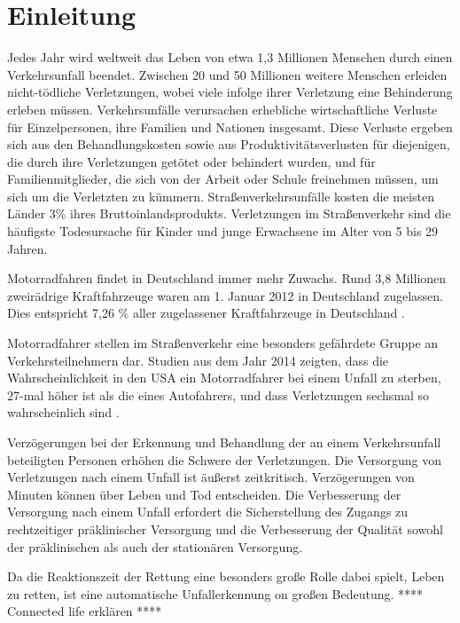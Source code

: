 \chapter{Einleitung}
%
%
%
%
%
%
Jedes Jahr wird weltweit das Leben von etwa 1,3 Millionen Menschen durch einen Verkehrsunfall beendet. Zwischen 20 und 50 Millionen weitere Menschen erleiden nicht-tödliche Verletzungen, wobei viele infolge ihrer Verletzung eine Behinderung erleben müssen. Verkehrsunfälle verursachen erhebliche wirtschaftliche Verluste für Einzelpersonen, ihre Familien und Nationen insgesamt. Diese Verluste ergeben sich aus den Behandlungskosten sowie aus Produktivitätsverlusten für diejenigen, die durch ihre Verletzungen getötet oder behindert wurden, und für Familienmitglieder, die sich von der Arbeit oder Schule freinehmen müssen, um sich um die Verletzten zu kümmern. Straßenverkehrsunfälle kosten die meisten Länder 3\% ihres Bruttoinlandsprodukts. Verletzungen im Straßenverkehr sind die häufigste Todesursache für Kinder und junge Erwachsene im Alter von 5 bis 29 Jahren.\citep{healthorganization2022}

Motorradfahren findet in Deutschland immer mehr Zuwachs.  Rund 3,8 Millionen zweirädrige Kraftfahrzeuge waren am 1. Januar 2012 in Deutschland zugelassen. Dies entspricht 7,26 \% aller zugelassener Kraftfahrzeuge in Deutschland \citep{Haedrich2012}.

Motorradfahrer stellen im Straßenverkehr eine besonders gefährdete Gruppe an Verkehrsteilnehmern dar. Studien aus dem Jahr 2014 zeigten, dass die Wahrscheinlichkeit in den USA ein Motorradfahrer bei einem Unfall zu sterben, 27-mal höher ist als die eines Autofahrers, und dass Verletzungen sechsmal so wahrscheinlich sind \citep{NHTSA}.

Verzögerungen bei der Erkennung und Behandlung der an einem Verkehrsunfall beteiligten Personen erhöhen die Schwere der Verletzungen. Die Versorgung von Verletzungen nach einem Unfall ist äußerst zeitkritisch. Verzögerungen von Minuten können über Leben und Tod entscheiden. Die Verbesserung der Versorgung nach einem Unfall erfordert die Sicherstellung des Zugangs zu rechtzeitiger präklinischer Versorgung und die Verbesserung der Qualität sowohl der präklinischen als auch der stationären Versorgung.\citep{healthorganization2022}

Da die Reaktionszeit der Rettung eine besonders große Rolle dabei spielt, Leben zu retten, ist eine automatische Unfallerkennung on großen Bedeutung.
**** Connected life erklären ****

